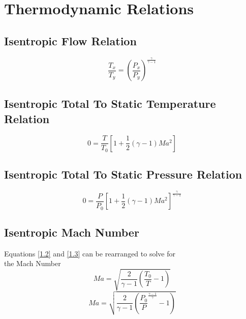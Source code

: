 \documentclass{article}
\begin{document}
\pagebreak

\section{Thermodynamic Relations\hfil\cite{RPE}}

\subsection{Isentropic Flow Relation}
\begin{equation} \tag{1.1} \label{1.1}
    \frac{T_x}{T_y} = \left(\frac{P_x}{P_y}\right) ^ {\frac{\gamma}{\gamma - 1}}
\end{equation}

\subsection{Isentropic Total To Static Temperature Relation}
\begin{equation} \tag{1.2} \label{1.2}
    0 = \frac{T}{T_0} \left[1 + \frac{1}{2} \left(\gamma - 1\right) Ma ^ 2\right]
\end{equation}

\subsection{Isentropic Total To Static Pressure Relation}
\begin{equation} \tag{1.3} \label{1.3}
    0 = \frac{P}{P_0} \left[1 + \frac{1}{2} \left(\gamma - 1\right) Ma ^ 2\right] ^ {\frac{\gamma}{\gamma - 1}}
\end{equation}

\subsection{Isentropic Mach Number}
Equations \eqref{1.2} and \eqref{1.3} can be rearranged to solve for \\
the Mach Number
\begin{equation} \tag{1.4a} \label{1.4a}
    Ma = \sqrt{\frac{2}{\gamma - 1} \left(\frac{T_0}{T} - 1\right)}
\end{equation}
\begin{equation} \tag{1.4b} \label{1.4b}
    Ma = \sqrt{\frac{2}{\gamma - 1} \left(\frac{P_0}{P} ^ {\frac{\gamma - 1}{\gamma}} - 1\right)}
\end{equation}

\pagebreak



\end{document}

